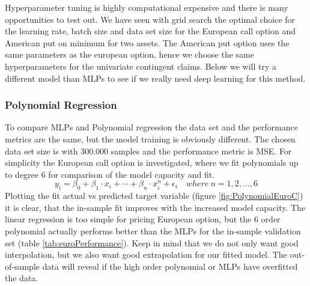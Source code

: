 Hyperparameter tuning is highly computational expensive and there is many opportunities to test out. We have seen with grid search the optimal choice for the learning rate, batch size and data set size for the European call option and American put on minimum for two assets. The American put option uses the same parameters as the european option, hence we choose the same hyperparameters for the univariate contingent claims. Below we will try a different model than MLPs to see if we really need deep learning for this method. 

\subsubsection{Polynomial Regression}
To compare MLPs and Polynomial regression the data set and the performance metrics are the same, but the model training is obviously different. The chosen data set size is with 300.000 samples and the performance metric is MSE. For simplicity the European call option is investigated, where we fit polynomials up to degree 6 for comparison of the model capacity and fit.  
$$y_i=\beta_0 + \beta_1 \cdot x_i + \cdots + \beta_n \cdot x_i^n + \epsilon_i \quad where \ n=1,2,\ldots,6$$
Plotting the fit actual vs predicted target variable (figure \ref{fig:PolynomialEuroC}) it is clear, that the in-sample fit improves with the increased model capacity. The linear regression is too simple for pricing European option, but the 6 order polynomial actually performs better than the MLPs for the in-sample validation set (table \ref{tab:euroPerformance}). Keep in mind that we do not only want good interpolation, but we also want good extrapolation for our fitted model. The out-of-sample data will reveal if the high order polynomial or MLPs have overfitted the data.\\

